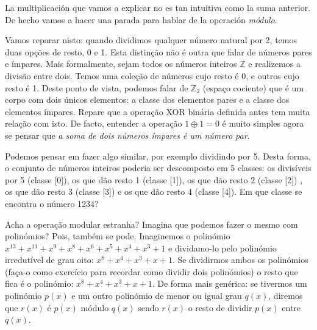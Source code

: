 La multiplicación que vamos a explicar no es tan intuitiva como la suma anterior. De hecho vamos a hacer una parada para hablar de la operación {\sl módulo}. 

Vamos reparar nisto: quando dividimos qualquer número natural por 2, temos duas opções de resto, 0 e 1. Esta distinção não é outra que falar de números pares e ímpares. Mais formalmente, sejam todos os números inteiros $\mathbb{Z}$ e realizemos a divisão entre dois. Temos uma coleção de números cujo resto é 0, e outros cujo resto é 1. Deste ponto de vista, podemos falar de $\mathbb{Z}_2$ (espaço cociente) que é um corpo com dois únicos elementos: a classe dos elementos pares e a classe dos elementos ímpares. Repare que a operação XOR binária definida antes tem muita relação com isto. De facto, entender a operação  $1 \oplus 1= 0$ é muito simples agora se pensar que {\sl a soma de dois números ímpares é um número par}.

Podemos pensar em fazer algo similar, por exemplo dividindo por 5. Desta forma, o conjunto de números inteiros poderia ser descomposto em 5 classes: os divisíveis por 5 (classe [0]), os que dão resto 1 (classe [1]), os que dão resto 2 (classe [2]) , os que dão resto 3 (classe [3]) e os que dão resto 4 (classe [4]). Em que classe se encontra o número 1234?

Acha a operação modular estranha? Imagina que podemos fazer o mesmo com polinómios? Pois, também se pode. Imaginemos o polinómio \mbox{$x^{13}+ x^{11}+x^9+x^8+ x^6+x^5+x^4+x^3+1$} e dividamo-lo pelo polinómio irredutível de grau oito: \mbox{$x^8+x^4+x^3+x+1$}. Se dividirmos ambos os polinómios (faça-o como exercício para recordar como dividir dois polinómios) o resto que fica é o polinómio: \mbox{$x^8+x^4+x^3+x+1$}. De forma mais genérica: se tivermos um polinómio $p(x)$ e um outro polinómio de menor ou igual grau $q(x)$, diremos que $r(x)$ é $p(x)$ módulo $q(x)$ sendo $r(x)$ o resto de dividir $p(x)$ entre $q(x)$.

